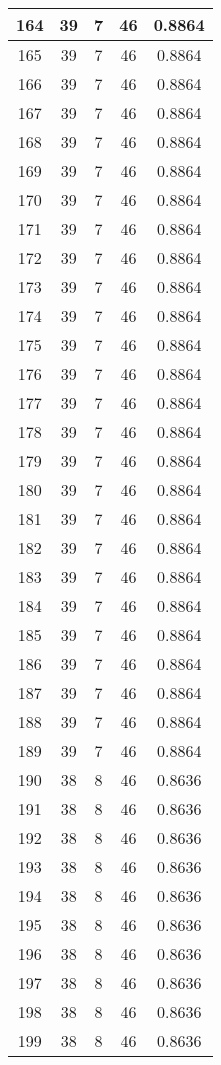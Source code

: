 \documentclass[letterpaper, 12pt]{article}
\begin{document}
\begin{longtable}{|c|c|c|c|c|}
\hline
164 & 39 & 7 & 46 & 0.8864 \\
\hline
165 & 39 & 7 & 46 & 0.8864 \\
\hline
166 & 39 & 7 & 46 & 0.8864 \\
\hline
167 & 39 & 7 & 46 & 0.8864 \\
\hline
168 & 39 & 7 & 46 & 0.8864 \\
\hline
169 & 39 & 7 & 46 & 0.8864 \\
\hline
170 & 39 & 7 & 46 & 0.8864 \\
\hline
171 & 39 & 7 & 46 & 0.8864 \\
\hline
172 & 39 & 7 & 46 & 0.8864 \\
\hline
173 & 39 & 7 & 46 & 0.8864 \\
\hline
174 & 39 & 7 & 46 & 0.8864 \\
\hline
175 & 39 & 7 & 46 & 0.8864 \\
\hline
176 & 39 & 7 & 46 & 0.8864 \\
\hline
177 & 39 & 7 & 46 & 0.8864 \\
\hline
178 & 39 & 7 & 46 & 0.8864 \\
\hline
179 & 39 & 7 & 46 & 0.8864 \\
\hline
180 & 39 & 7 & 46 & 0.8864 \\
\hline
181 & 39 & 7 & 46 & 0.8864 \\
\hline
182 & 39 & 7 & 46 & 0.8864 \\
\hline
183 & 39 & 7 & 46 & 0.8864 \\
\hline
184 & 39 & 7 & 46 & 0.8864 \\
\hline
185 & 39 & 7 & 46 & 0.8864 \\
\hline
186 & 39 & 7 & 46 & 0.8864 \\
\hline
187 & 39 & 7 & 46 & 0.8864 \\
\hline
188 & 39 & 7 & 46 & 0.8864 \\
\hline
189 & 39 & 7 & 46 & 0.8864 \\
\hline
190 & 38 & 8 & 46 & 0.8636 \\
\hline
191 & 38 & 8 & 46 & 0.8636 \\
\hline
192 & 38 & 8 & 46 & 0.8636 \\
\hline
193 & 38 & 8 & 46 & 0.8636 \\
\hline
194 & 38 & 8 & 46 & 0.8636 \\
\hline
195 & 38 & 8 & 46 & 0.8636 \\
\hline
196 & 38 & 8 & 46 & 0.8636 \\
\hline
197 & 38 & 8 & 46 & 0.8636 \\
\hline
198 & 38 & 8 & 46 & 0.8636 \\
\hline
199 & 38 & 8 & 46 & 0.8636 \\
\hline
\end{longtable}
\end{document}
